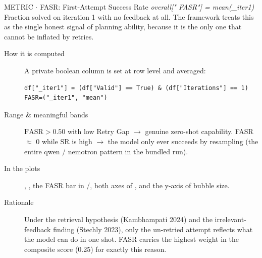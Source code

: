 \begin{bmmcard}{METRIC \(\cdot\) FASR: First-Attempt Success Rate}
\emph{overall[" FASR"] = mean(\_iter1)}
Fraction solved on iteration 1 with no feedback at all. The framework treats this as the single honest signal of planning ability, because it is the only one that cannot be inflated by retries.
\begin{description}
\item[How it is computed] A private boolean column is set at row level and averaged:

\begin{lstlisting}
df["_iter1"] = (df["Valid"] == True) & (df["Iterations"] == 1)
FASR=("_iter1", "mean")
\end{lstlisting}
\item[Range \& meaningful bands] \(\mathrm{FASR}>0.50\) with low Retry Gap \(\rightarrow\) genuine zero-shot capability. FASR \(\approx\) 0 while SR is high \(\rightarrow\) the model only ever succeeds by resampling (the entire qwen / nemotron pattern in the bundled run).
\item[In the plots] \raggedright
{},\allowbreak{}
,\allowbreak{}
the FASR bar in /\allowbreak{},\allowbreak{}
both axes of ,\allowbreak{}
and the y-axis of  bubble size.
\item[Rationale] Under the retrieval hypothesis (Kambhampati 2024) and the irrelevant-feedback finding (Stechly 2023), only the un-retried attempt reflects what the model can do in one shot. FASR carries the highest weight in the composite score (0.25) for exactly this reason.
\end{description}
\end{bmmcard}

